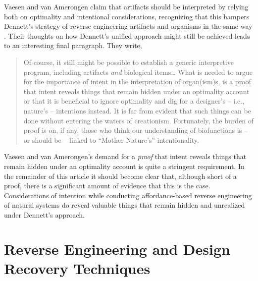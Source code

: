 Vaesen and van Amerongen claim that artifacts should be interpreted by
relying both on optimality and intentional considerations, recognizing
that this hampers Dennett’s strategy of reverse engineering artifacts
and organisms in the same way \citep[][pp. 794--795]{vaesenamerongen2008}. Their thoughts on
how Dennett’s unified approach might still be achieved leads to an
interesting final paragraph. They write,

\begin{quote}
Of course, it still might be
possible to establish a generic interpretive program, including
artifacts \textit{and} biological items… What is needed to argue for
the importance of intent in the interpretation of organ(ism)s, is a
proof that intent reveals things that remain hidden under an optimality
account or that it is beneficial to ignore optimality and dig for a
designer’s – i.e., nature’s – intentions instead. It is far from
evident that such things can be done without entering the waters of
creationism. Fortunately, the burden of proof is on, if any, those who
think our understanding of biofunctions is – or should be – linked to
“Mother Nature’s” intentionality.  \citep[][p.~795]{vaesenamerongen2008}
\end{quote}

Vaesen and van
Amerongen’s demand for a \textit{proof} that intent reveals things that
remain hidden under an optimality account is quite a stringent
requirement. In the remainder of this article it should become clear
that, although short of a proof, there is a significant amount of
evidence that this is the case. Considerations of intention while
conducting affordance-based reverse engineering of natural systems do
reveal valuable things that remain hidden and unrealized under
Dennett’s approach.

\section[Design Recovery Techniques]{Reverse Engineering and Design Recovery Techniques}

